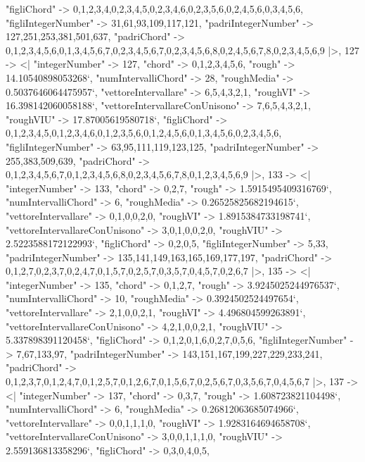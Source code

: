\documentclass[
]{article}
\begin{document}
\begin{DatasetVerbatim}
    "figliChord" -> {{0,1,2,3,4},{0,2,3,4,5},{0,2,3,4,6},{0,2,3,5,6},{0,2,4,5,6},{0,3,4,5,6}},
    "figliIntegerNumber" -> {31,61,93,109,117,121},
    "padriIntegerNumber" -> {127,251,253,381,501,637},
    "padriChord" -> {{0,1,2,3,4,5,6},{0,1,3,4,5,6,7},{0,2,3,4,5,6,7},{0,2,3,4,5,6,8},{0,2,4,5,6,7,8},{0,2,3,4,5,6,9}}
  |>,
  127 -> <|
    "integerNumber" -> 127,
    "chord" -> {0,1,2,3,4,5,6},
    "rough" -> 14.10540898053268`,
    "numIntervalliChord" -> 28,
    "roughMedia" -> 0.5037646064475957`,
    "vettoreIntervallare" -> {6,5,4,3,2,1},
    "roughVI" -> 16.398142060058188`,
    "vettoreIntervallareConUnisono" -> {7,6,5,4,3,2,1},
    "roughVIU" -> 17.87005619580718`,
    "figliChord" -> {{0,1,2,3,4,5},{0,1,2,3,4,6},{0,1,2,3,5,6},{0,1,2,4,5,6},{0,1,3,4,5,6},{0,2,3,4,5,6}},
    "figliIntegerNumber" -> {63,95,111,119,123,125},
    "padriIntegerNumber" -> {255,383,509,639},
    "padriChord" -> {{0,1,2,3,4,5,6,7},{0,1,2,3,4,5,6,8},{0,2,3,4,5,6,7,8},{0,1,2,3,4,5,6,9}}
  |>,
  133 -> <|
    "integerNumber" -> 133,
    "chord" -> {0,2,7},
    "rough" -> 1.5915495409316769`,
    "numIntervalliChord" -> 6,
    "roughMedia" -> 0.26525825682194615`,
    "vettoreIntervallare" -> {0,1,0,0,2,0},
    "roughVI" -> 1.8915384733198741`,
    "vettoreIntervallareConUnisono" -> {3,0,1,0,0,2,0},
    "roughVIU" -> 2.5223588172122993`,
    "figliChord" -> {{0,2},{0,5}},
    "figliIntegerNumber" -> {5,33},
    "padriIntegerNumber" -> {135,141,149,163,165,169,177,197},
    "padriChord" -> {{0,1,2,7},{0,2,3,7},{0,2,4,7},{0,1,5,7},{0,2,5,7},{0,3,5,7},{0,4,5,7},{0,2,6,7}}
  |>,
  135 -> <|
    "integerNumber" -> 135,
    "chord" -> {0,1,2,7},
    "rough" -> 3.9245025244976537`,
    "numIntervalliChord" -> 10,
    "roughMedia" -> 0.3924502524497654`,
    "vettoreIntervallare" -> {2,1,0,0,2,1},
    "roughVI" -> 4.496804599263891`,
    "vettoreIntervallareConUnisono" -> {4,2,1,0,0,2,1},
    "roughVIU" -> 5.337898391120458`,
    "figliChord" -> {{0,1,2},{0,1,6},{0,2,7},{0,5,6}},
    "figliIntegerNumber" -> {7,67,133,97},
    "padriIntegerNumber" -> {143,151,167,199,227,229,233,241},
    "padriChord" -> {{0,1,2,3,7},{0,1,2,4,7},{0,1,2,5,7},{0,1,2,6,7},{0,1,5,6,7},{0,2,5,6,7},{0,3,5,6,7},{0,4,5,6,7}}
  |>,
  137 -> <|
    "integerNumber" -> 137,
    "chord" -> {0,3,7},
    "rough" -> 1.608723821104498`,
    "numIntervalliChord" -> 6,
    "roughMedia" -> 0.26812063685074966`,
    "vettoreIntervallare" -> {0,0,1,1,1,0},
    "roughVI" -> 1.9283164694658708`,
    "vettoreIntervallareConUnisono" -> {3,0,0,1,1,1,0},
    "roughVIU" -> 2.559136813358296`,
    "figliChord" -> {{0,3},{0,4},{0,5}},

\end{DatasetVerbatim}
\end{document}

